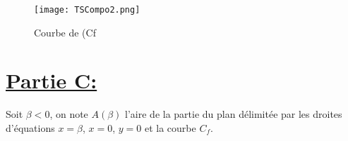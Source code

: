 \documentclass[12pt]{article}
\begin{document}
\begin{itemize}
\begin{center}
    
\begin{figure}[h]
\centering
\texttt{[image: TSCompo2.png]}
\caption{Courbe de (Cf}
\label{fig:monimage}
\end{figure}
    \end{center}
\end{itemize}
\section*{\underline{Partie C:}}
Soit $\beta < 0$, on note $A(\beta)$ l'aire de la partie du plan délimitée par les droites d'équations $x = \beta$, $x = 0$, $y = 0$ et la courbe $C_f$.
\end{document}

